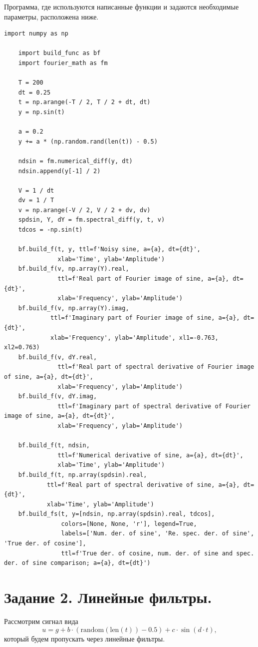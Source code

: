 \documentclass[a4paper, 12pt]{article}
\begin{document}
    Программа, где используются написанные функции и задаются необходимые параметры, расположена ниже.
    \begin{lstlisting}[label=l, caption={Алгоритм, использующий представленные ранее программы.}]
    import numpy as np

    import build_func as bf
    import fourier_math as fm

    T = 200
    dt = 0.25
    t = np.arange(-T / 2, T / 2 + dt, dt)
    y = np.sin(t)

    a = 0.2
    y += a * (np.random.rand(len(t)) - 0.5)

    ndsin = fm.numerical_diff(y, dt)
    ndsin.append(y[-1] / 2)

    V = 1 / dt
    dv = 1 / T
    v = np.arange(-V / 2, V / 2 + dv, dv)
    spdsin, Y, dY = fm.spectral_diff(y, t, v)
    tdcos = -np.sin(t)

    bf.build_f(t, y, ttl=f'Noisy sine, a={a}, dt={dt}',
               xlab='Time', ylab='Amplitude')
    bf.build_f(v, np.array(Y).real,
               ttl=f'Real part of Fourier image of sine, a={a}, dt={dt}',
               xlab='Frequency', ylab='Amplitude')
    bf.build_f(v, np.array(Y).imag,
             ttl=f'Imaginary part of Fourier image of sine, a={a}, dt={dt}',
             xlab='Frequency', ylab='Amplitude', xl1=-0.763, xl2=0.763)
    bf.build_f(v, dY.real,
               ttl=f'Real part of spectral derivative of Fourier image of sine, a={a}, dt={dt}',
               xlab='Frequency', ylab='Amplitude')
    bf.build_f(v, dY.imag,
               ttl=f'Imaginary part of spectral derivative of Fourier image of sine, a={a}, dt={dt}',
               xlab='Frequency', ylab='Amplitude')

    bf.build_f(t, ndsin,
               ttl=f'Numerical derivative of sine, a={a}, dt={dt}',
               xlab='Time', ylab='Amplitude')
    bf.build_f(t, np.array(spdsin).real,
            ttl=f'Real part of spectral derivative of sine, a={a}, dt={dt}',
            xlab='Time', ylab='Amplitude')
    bf.build_fs(t, y=[ndsin, np.array(spdsin).real, tdcos],
                colors=[None, None, 'r'], legend=True, 
                labels=['Num. der. of sine', 'Re. spec. der. of sine', 'True der. of cosine'],
                ttl=f'True der. of cosine, num. der. of sine and spec. der. of sine comparison; a={a}, dt={dt}')
    \end{lstlisting}


    \section{Задание 2. Линейные фильтры.}
    Рассмотрим сигнал вида $$u=g+b\cdot(\text{random}(\text{len}(t))-0.5) + c\cdot \sin(d\cdot t),$$ который будем пропускать
    через линейные фильтры.
\end{document}
